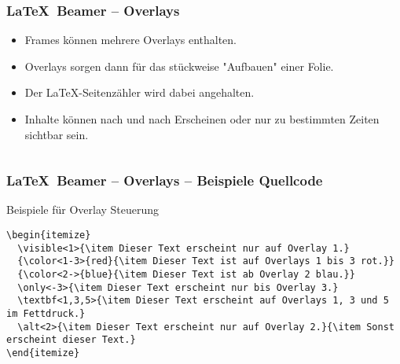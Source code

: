 \begin{frame}[fragile]
	\frametitle{\LaTeX\ Beamer -- Overlays}
	\begin{itemize}
		\item Frames können mehrere Overlays enthalten.
		\item Overlays sorgen dann für das stückweise "Aufbauen" einer Folie.
		\item Der \LaTeX-Seitenzähler wird dabei angehalten.
		\item Inhalte können nach und nach Erscheinen oder nur zu bestimmten Zeiten sichtbar sein.
	\end{itemize}
	
	\begin{columns}
	\end{columns}
\end{frame}

\begin{frame}[fragile]
	\frametitle{\LaTeX\ Beamer -- Overlays -- Beispiele Quellcode}
	\begin{block}{Beispiele für Overlay Steuerung}
		\begin{lstlisting}
\begin{itemize}
  \visible<1>{\item Dieser Text erscheint nur auf Overlay 1.}
  {\color<1-3>{red}{\item Dieser Text ist auf Overlays 1 bis 3 rot.}}
  {\color<2->{blue}{\item Dieser Text ist ab Overlay 2 blau.}}
  \only<-3>{\item Dieser Text erscheint nur bis Overlay 3.}
  \textbf<1,3,5>{\item Dieser Text erscheint auf Overlays 1, 3 und 5 im Fettdruck.}
  \alt<2>{\item Dieser Text erscheint nur auf Overlay 2.}{\item Sonst erscheint dieser Text.}
\end{itemize}
		\end{lstlisting}
	\end{block}
\end{frame}

